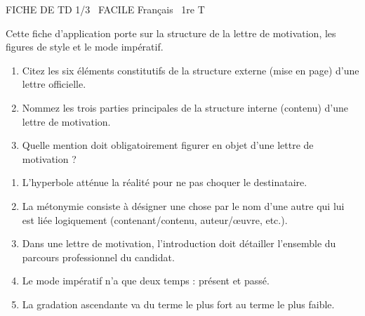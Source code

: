 \documentclass[11pt]{article}
\begin{document}
\begin{tcolorbox}[enhanced,colback=popink,colframe=popink,arc=10pt,boxrule=0pt,left=12pt,right=12pt,top=9pt,bottom=9pt]
{\color{white}\popxbold\small FICHE DE TD 1/3 \textbullet\ FACILE \hfill Français \textbullet\ 1re T\par}
\end{tcolorbox}
\vspace{4pt}
Cette fiche d'application porte sur la structure de la lettre de motivation, les figures de style et le mode impératif.

\begin{exercice}
\begin{enumerate}
    \item Citez les six éléments constitutifs de la structure externe (mise en page) d'une lettre officielle.
    \item Nommez les trois parties principales de la structure interne (contenu) d'une lettre de motivation.
    \item Quelle mention doit obligatoirement figurer en objet d'une lettre de motivation ?
\end{enumerate}
\end{exercice}

\begin{exercice}
\begin{enumerate}
    \item L'hyperbole atténue la réalité pour ne pas choquer le destinataire.
    \item La métonymie consiste à désigner une chose par le nom d'une autre qui lui est liée logiquement (contenant/contenu, auteur/œuvre, etc.).
    \item Dans une lettre de motivation, l'introduction doit détailler l'ensemble du parcours professionnel du candidat.
    \item Le mode impératif n'a que deux temps : présent et passé.
    \item La gradation ascendante va du terme le plus fort au terme le plus faible.
\end{enumerate}
\end{exercice}
\end{document}
